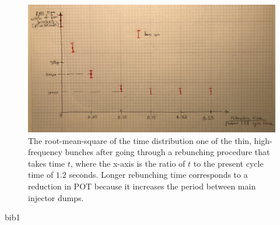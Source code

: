 \documentclass[12pt]{article}
\begin{document}
\begin{figure}[t]
	\begin{center}
        \includegraphics[width=1.0\linewidth]{Figures/draft_rms_vs_time.JPG}
	\end{center}
	\caption{The root-mean-square of the time distribution one of the thin, high-frequency bunches after going through a rebunching procedure that takes time $t$, where the x-axis is the ratio of $t$ to the present cycle time of $1.2$ seconds. Longer rebunching time corresponds to a reduction in POT because it increases the period between main injector dumps.}
		\label{fig:bunch_width_curve}
\end{figure}


\begin{thebibliography}{99}
 bib1 
\end{thebibliography}
\end{document}
